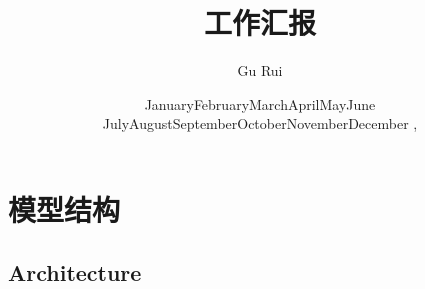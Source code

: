 \documentclass[CJK,aspectratio=169]{beamer}  %
\begin{document}
	
	\title{工作汇报}
	\author[Gu Rui (LZU)]{Gu Rui }
	
	\newcommand{\monthname}[1][\the\month]{%
		\ifcase#1\or
		January\or February\or March\or April\or May\or June\or
		July\or August\or September\or October\or November\or December\fi}
		
	\renewcommand{\today}{\monthname[\the\month] \the\day, \the\year}
	\renewcommand{\figurename}{Figure}
	\renewcommand{\tablename}{Table}
	\renewcommand{\refname}{References}
	\date{\today}
	
	\begin{frame}
		\titlepage
	\end{frame}
	
	\begin{frame}
			\small \tableofcontents
	\end{frame}
	
%		
%			
	
	\section{模型结构}
	
	\subsection{Architecture}
	
\end{document}
